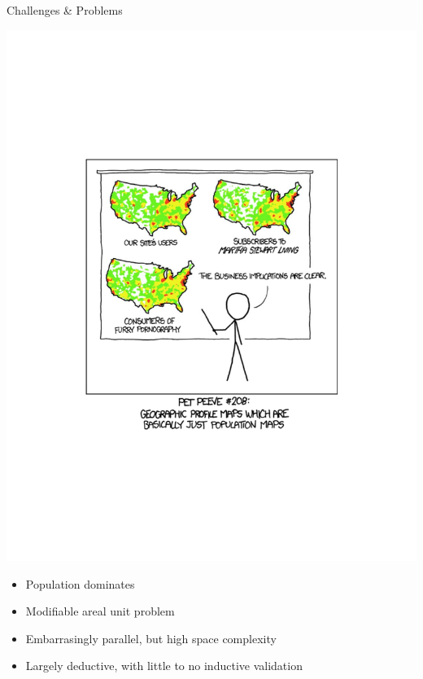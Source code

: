 \documentclass{beamer}
\begin{document}


\begin{frame}{Challenges \& Problems}
  \begin{center}
    \includegraphics[width=0.4\textheight]{heatmap}
  \end{center}
  \begin{itemize}
  \item Population dominates
  \item Modifiable areal unit problem
  \item Embarrasingly parallel, but high space complexity
  \item Largely deductive, with little to no inductive validation
  \end{itemize}
\end{frame}
\end{document}
